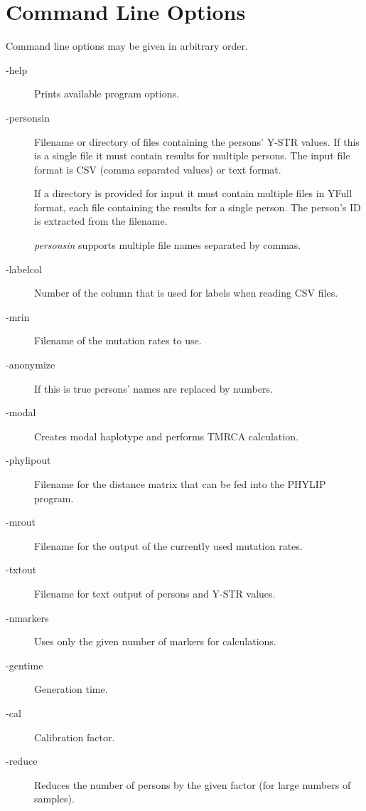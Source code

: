 \section{Command Line Options}

Command line options may be given in arbitrary order.

\begin{description}
\item[-help] Prints available program options.
\item[-personsin] Filename or directory of files containing the
	persons' Y-STR values. If this is a single file it must contain
	results for multiple persons. The input file format is CSV
    (comma separated values) or text format.

	If a directory is provided for input it must contain multiple
	files in YFull format, each file containing the results for
	a single person. The person's ID is extracted from the filename.

	\emph{personsin} supports multiple file names separated by
	commas.
\item[-labelcol] Number of the column that is used for labels
	when reading CSV files.
\item[-mrin] Filename of the mutation rates to use.
\item[-anonymize] If this is true persons' names are replaced by numbers.
\item[-modal] Creates modal haplotype and performs TMRCA calculation.
\item[-phylipout] Filename for the distance matrix that can be fed into
	the PHYLIP\cite{Phylip} program.
\item[-mrout] Filename for the output of the currently used mutation rates.
\item[-txtout] Filename for text output of persons and Y-STR values.
\item[-nmarkers] Uses only the given number of markers for calculations.
\item[-gentime] Generation time.
\item[-cal] Calibration factor.
\item[-reduce] Reduces the number of persons by the given factor
	 (for large numbers of samples).
\end{description}

